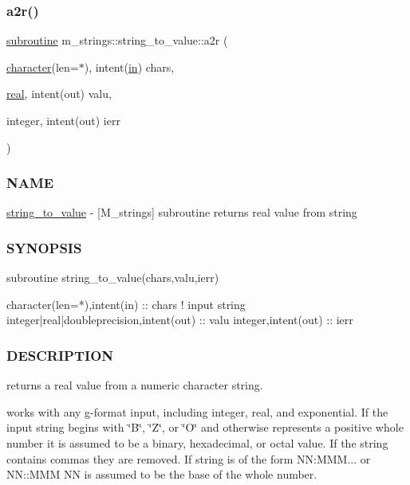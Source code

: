 \subsubsection{\texorpdfstring{a2r()}{a2r()}}
{\footnotesize\ttfamily \hyperlink{M__stopwatch_83_8txt_acfbcff50169d691ff02d4a123ed70482}{subroutine} m\+\_\+strings\+::string\+\_\+to\+\_\+value\+::a2r (\begin{DoxyParamCaption}\item[{\hyperlink{option__stopwatch_83_8txt_abd4b21fbbd175834027b5224bfe97e66}{character}(len=$\ast$), intent(\hyperlink{M__journal_83_8txt_afce72651d1eed785a2132bee863b2f38}{in})}]{chars,  }\item[{\hyperlink{read__watch_83_8txt_abdb62bde002f38ef75f810d3a905a823}{real}, intent(out)}]{valu,  }\item[{integer, intent(out)}]{ierr }\end{DoxyParamCaption})\hspace{0.3cm}{\ttfamily [private]}}



\subsubsection*{N\+A\+ME}

\hyperlink{interfacem__strings_1_1string__to__value}{string\+\_\+to\+\_\+value} -\/ \mbox{[}M\+\_\+strings\mbox{]} subroutine returns real value from string 

\subsubsection*{S\+Y\+N\+O\+P\+S\+IS}

\begin{DoxyVerb}subroutine string_to_value(chars,valu,ierr)

 character(len=*),intent(in) :: chars   ! input string
 integer|real|doubleprecision,intent(out)         :: valu
 integer,intent(out)         :: ierr
\end{DoxyVerb}


\subsubsection*{D\+E\+S\+C\+R\+I\+P\+T\+I\+ON}

returns a real value from a numeric character string.

works with any g-\/format input, including integer, real, and exponential. If the input string begins with \char`\"{}\+B\char`\"{}, \char`\"{}\+Z\char`\"{}, or \char`\"{}\+O\char`\"{} and otherwise represents a positive whole number it is assumed to be a binary, hexadecimal, or octal value. If the string contains commas they are removed. If string is of the form NN\+:M\+MM... or N\+N\+::\+M\+MM NN is assumed to be the base of the whole number.

